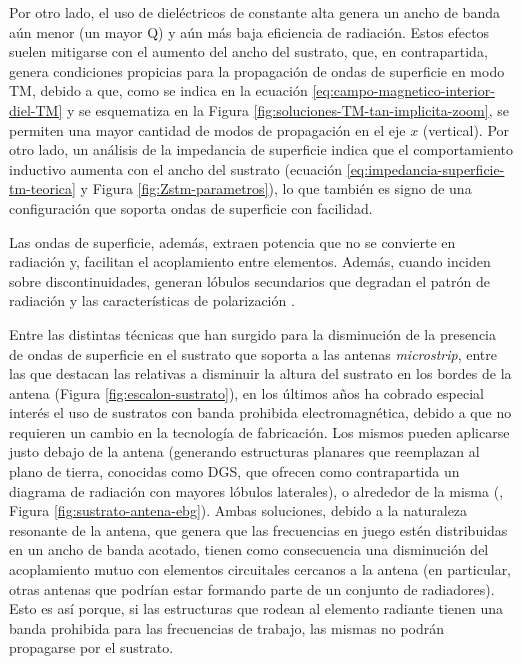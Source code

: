 Por otro lado, el uso de dieléctricos de constante alta genera un ancho de banda aún menor (un mayor Q) y aún más baja eficiencia de radiación. Estos efectos suelen mitigarse con el aumento del ancho del sustrato, que, en contrapartida, genera condiciones propicias para la propagación de ondas de superficie en modo TM, debido a que, como se indica en la ecuación \ref{eq:campo-magnetico-interior-diel-TM} y se esquematiza en la Figura \ref{fig:soluciones-TM-tan-implicita-zoom}, se permiten una mayor cantidad de modos de propagación en el eje $x$ (vertical). Por otro lado, un análisis de la impedancia de superficie indica que el comportamiento inductivo aumenta con el ancho del sustrato (ecuación \ref{eq:impedancia-superficie-tm-teorica} y Figura \ref{fig:Zstm-parametros}), lo que también es signo de una configuración que soporta ondas de superficie con facilidad.

Las ondas de superficie, además, extraen potencia que no se convierte en radiación y, facilitan el acoplamiento entre elementos. Además, cuando inciden sobre discontinuidades, generan lóbulos secundarios que degradan el patrón de radiación y las características de polarización \cite{Balanis:Theory}.

Entre las distintas técnicas que han surgido para la disminución de la presencia de ondas de superficie en el sustrato que soporta a las antenas \textit{microstrip}, entre las que destacan las relativas a disminuir la altura del sustrato en los bordes de la antena (Figura \ref{fig:escalon-sustrato}), en los últimos años ha cobrado especial interés el uso de sustratos con banda prohibida electromagnética, debido a que no requieren un cambio en la tecnología de fabricación. Los mismos pueden aplicarse justo debajo de la antena (generando estructuras planares que reemplazan al plano de tierra, conocidas como DGS, que ofrecen como contrapartida un diagrama de radiación con mayores lóbulos laterales), o alrededor de la misma (\cite{Marcela:Tesis}, Figura \ref{fig:sustrato-antena-ebg}). Ambas soluciones, debido a la naturaleza resonante de la antena, que genera que las frecuencias en juego estén distribuidas en un ancho de banda acotado, tienen como consecuencia una disminución del acoplamiento mutuo con elementos circuitales cercanos a la antena (en particular, otras antenas que podrían estar formando parte de un conjunto de radiadores). Esto es así porque, si las estructuras que rodean al elemento radiante tienen una banda prohibida para las frecuencias de trabajo, las mismas no podrán propagarse por el sustrato.


